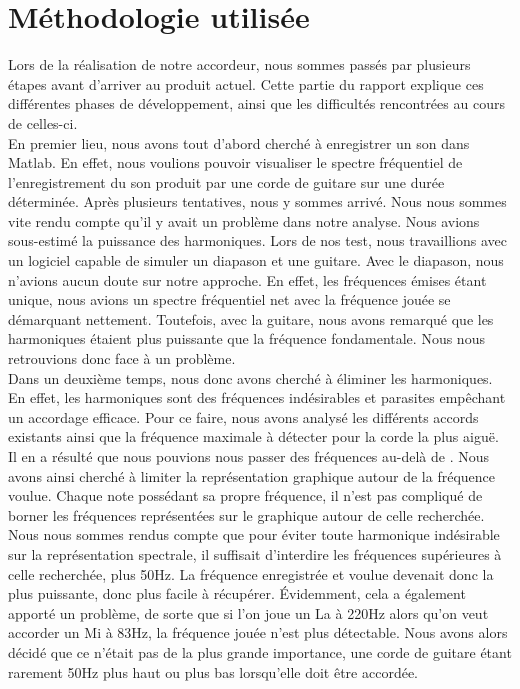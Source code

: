 \section{Méthodologie utilisée}
Lors de la réalisation de notre accordeur, nous sommes passés par plusieurs étapes avant d'arriver au produit actuel. Cette partie du rapport explique ces différentes phases de développement, ainsi que les difficultés rencontrées au cours de celles-ci.\\

En premier lieu, nous avons tout d'abord cherché à enregistrer un son dans Matlab. En effet, nous voulions pouvoir visualiser le spectre fréquentiel de l'enregistrement du son produit par une corde de guitare sur une durée déterminée.
Après plusieurs tentatives, nous y sommes arrivé.
Nous nous sommes vite rendu compte qu'il y avait un problème dans notre analyse.
Nous avions sous-estimé la puissance des harmoniques.
Lors de nos test, nous travaillions avec un logiciel capable de simuler un diapason et une guitare.
Avec le diapason, nous n'avions aucun doute sur notre approche. En effet, les fréquences émises étant unique, nous avions un spectre fréquentiel net avec la fréquence jouée se démarquant nettement.
Toutefois, avec la guitare, nous avons remarqué que les harmoniques étaient plus puissante que la fréquence fondamentale. Nous nous retrouvions donc face à un problème.\\

Dans un deuxième temps, nous donc avons cherché à éliminer les harmoniques. En effet, les harmoniques sont des fréquences indésirables et parasites empêchant un accordage efficace.
Pour ce faire, nous avons analysé les différents accords existants ainsi que la fréquence maximale à détecter pour la corde la plus aiguë.
Il en a résulté que nous pouvions nous passer des fréquences au-delà de .
Nous avons ainsi cherché à limiter la représentation graphique autour de la fréquence voulue.
Chaque note possédant sa propre fréquence, il n'est pas compliqué de borner les fréquences représentées sur le graphique autour de celle recherchée. Nous nous sommes rendus compte que pour éviter toute harmonique indésirable sur la représentation spectrale, il suffisait d'interdire les fréquences supérieures à celle recherchée, plus 50Hz. La fréquence enregistrée et voulue devenait donc la plus puissante, donc plus facile à récupérer. Évidemment, cela a également apporté un problème, de sorte que si l'on joue un La à 220Hz alors qu'on veut accorder un Mi à 83Hz, la fréquence jouée n'est plus détectable. Nous avons alors décidé que ce n'était pas de la plus grande importance, une corde de guitare étant rarement 50Hz plus haut ou plus bas lorsqu'elle doit être accordée. \\

